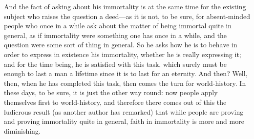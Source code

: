 \documentclass[12pt]{article}
\begin{document}
And the fact of asking about his immortality is at the same time for
the existing subject who raises the question a deed---as it is not, to
be sure, for absent-minded people who once in a while ask about the
matter of being immortal quite in general, as if immortality were
something one has once in a while, and the question were some sort of
thing in general. So he asks how he is to behave in order to express
in existence his immortality, whether he is really expressing it; and
for the time being, he is satisfied with this task, which surely must
be enough to last a man a lifetime since it is to last for an eternity.
And then? Well, then, when he has completed this task, then comes the
turn for world-history. In these days, to be sure, it is just the
other way round: now people apply themselves first to world-history,
and therefore there comes out of this the ludicrous result (as another
author has remarked) that while people are proving and proving
immortality quite in general, faith in immortality is more and more
diminishing.
\end{document}
